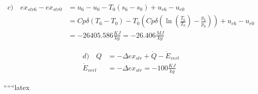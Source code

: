 \begin{align*}
c) \quad ex_{str6} - ex_{str0} &= u_6 - u_0 - T_0 (s_6 - s_0) + u_{e6} - u_{e0} \\
&= Cp\delta (T_6 - T_0) - T_0 \left( Cp\delta \left( \ln \left( \frac{T_6}{T_0} \right) - \frac{p_6}{p_0} \right) \right) + u_{e6} - u_{e0} \\
&= -26405.586 \frac{KJ}{kg} = -26.406 \frac{MJ}{kg}
\end{align*}

\begin{align*}
d) \quad Q &= -\Delta ex_{str} + \dot{Q} - \dot{E}_{verl} \\
\dot{E}_{verl} &= -\Delta ex_{str} = -100 \frac{KJ}{kg}
\end{align*}

``````latex


